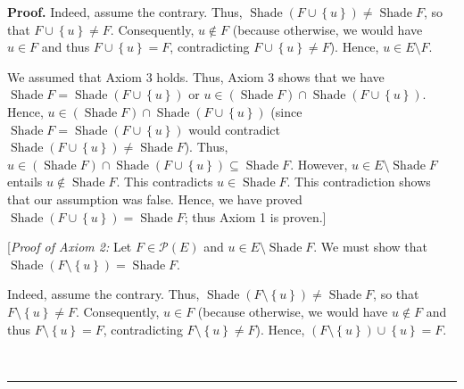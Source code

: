 \documentclass[numbers=enddot,12pt,final,onecolumn]{scrartcl}%
\theoremstyle{definition}
\newenvironment{proof}[1][Proof]{\noindent\textbf{#1.} }{\ \rule{0.5em}{0.5em}}
\newenvironment{verlong}{}{}
\begin{document}
\begin{verlong}
\begin{proof}
Indeed, assume the contrary. Thus, $\operatorname*{Shade}\left(  F\cup\left\{
u\right\}  \right)  \neq\operatorname*{Shade}F$, so that $F\cup\left\{
u\right\}  \neq F$. Consequently, $u\notin F$ (because otherwise, we would
have $u\in F$ and thus $F\cup\left\{  u\right\}  =F$, contradicting
$F\cup\left\{  u\right\}  \neq F$). Hence, $u\in E\setminus F$.

We assumed that Axiom 3 holds. Thus, Axiom 3 shows that we have
$\operatorname*{Shade}F=\operatorname*{Shade}\left(  F\cup\left\{  u\right\}
\right)  $ or $u\in\left(  \operatorname*{Shade}F\right)  \cap
\operatorname*{Shade}\left(  F\cup\left\{  u\right\}  \right)  $. Hence,
$u\in\left(  \operatorname*{Shade}F\right)  \cap\operatorname*{Shade}\left(
F\cup\left\{  u\right\}  \right)  $ (since $\operatorname*{Shade}%
F=\operatorname*{Shade}\left(  F\cup\left\{  u\right\}  \right)  $ would
contradict $\operatorname*{Shade}\left(  F\cup\left\{  u\right\}  \right)
\neq\operatorname*{Shade}F$). Thus, $u\in\left(  \operatorname*{Shade}%
F\right)  \cap\operatorname*{Shade}\left(  F\cup\left\{  u\right\}  \right)
\subseteq\operatorname*{Shade}F$. However, $u\in E\setminus
\operatorname*{Shade}F$ entails $u\notin\operatorname*{Shade}F$. This
contradicts $u\in\operatorname*{Shade}F$. This contradiction shows that our
assumption was false. Hence, we have proved $\operatorname*{Shade}\left(
F\cup\left\{  u\right\}  \right)  =\operatorname*{Shade}F$; thus Axiom 1 is proven.]

[\textit{Proof of Axiom 2:} Let $F\in\mathcal{P}\left(  E\right)  $ and $u\in
E\setminus\operatorname*{Shade}F$. We must show that $\operatorname*{Shade}%
\left(  F\setminus\left\{  u\right\}  \right)  =\operatorname*{Shade}F$.

Indeed, assume the contrary. Thus, $\operatorname*{Shade}\left(
F\setminus\left\{  u\right\}  \right)  \neq\operatorname*{Shade}F$, so that
$F\setminus\left\{  u\right\}  \neq F$. Consequently, $u\in F$ (because
otherwise, we would have $u\notin F$ and thus $F\setminus\left\{  u\right\}
=F$, contradicting $F\setminus\left\{  u\right\}  \neq F$). Hence, $\left(
F\setminus\left\{  u\right\}  \right)  \cup\left\{  u\right\}  =F$.


\end{proof}
\end{verlong}
\end{document}
